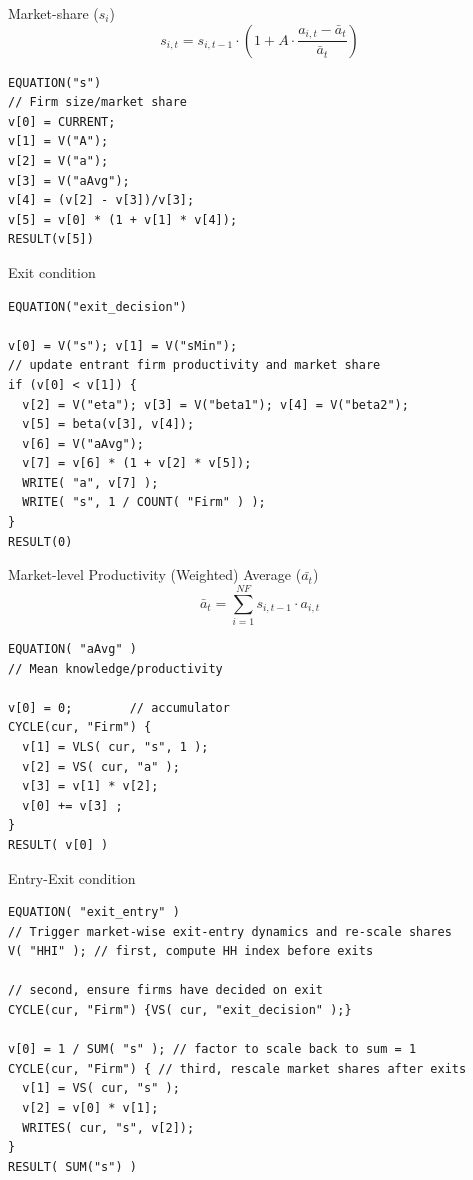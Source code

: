 \documentclass[bigger,aspectratio=169]{beamer}
\begin{document}
\begin{frame}[label={sec:orgd78fa78},fragile]{Market-share (\(s_{i}\))}
 \begin{equation}
s_{i,t} = s_{i,t-1} \cdot \left( 1 + A\cdot\frac{a_{i,t} - \bar{a}_{t}}{\bar{a}_{t}}\right)
\end{equation}


\begin{verbatim}
EQUATION("s")
// Firm size/market share
v[0] = CURRENT;
v[1] = V("A");
v[2] = V("a");
v[3] = V("aAvg");
v[4] = (v[2] - v[3])/v[3];
v[5] = v[0] * (1 + v[1] * v[4]);
RESULT(v[5])
\end{verbatim}
\end{frame}
\begin{frame}[label={sec:org3c3203a},fragile]{Exit condition}
 \begin{verbatim}
EQUATION("exit_decision")

v[0] = V("s"); v[1] = V("sMin");
// update entrant firm productivity and market share
if (v[0] < v[1]) {
  v[2] = V("eta"); v[3] = V("beta1"); v[4] = V("beta2");
  v[5] = beta(v[3], v[4]);
  v[6] = V("aAvg");
  v[7] = v[6] * (1 + v[2] * v[5]);
  WRITE( "a", v[7] );
  WRITE( "s", 1 / COUNT( "Firm" ) );
}
RESULT(0)
\end{verbatim}
\end{frame}
\begin{frame}[label={sec:org707f1d1},fragile]{Market-level Productivity (Weighted) Average (\(\bar{a_{t}}\))}
 \begin{equation}
\bar{a}_{t} =  \sum_{i=1}^{NF} s_{i, t-1}\cdot a_{i,t}
\end{equation}


\begin{verbatim}
EQUATION( "aAvg" )
// Mean knowledge/productivity

v[0] = 0;        // accumulator
CYCLE(cur, "Firm") {
  v[1] = VLS( cur, "s", 1 );
  v[2] = VS( cur, "a" );
  v[3] = v[1] * v[2];
  v[0] += v[3] ;
}
RESULT( v[0] )
\end{verbatim}
\end{frame}
\begin{frame}[label={sec:org9008db5},fragile]{Entry-Exit condition}
 \begin{verbatim}
EQUATION( "exit_entry" )
// Trigger market-wise exit-entry dynamics and re-scale shares
V( "HHI" ); // first, compute HH index before exits

// second, ensure firms have decided on exit
CYCLE(cur, "Firm") {VS( cur, "exit_decision" );}

v[0] = 1 / SUM( "s" ); // factor to scale back to sum = 1
CYCLE(cur, "Firm") { // third, rescale market shares after exits
  v[1] = VS( cur, "s" );
  v[2] = v[0] * v[1];
  WRITES( cur, "s", v[2]);
}
RESULT( SUM("s") )
\end{verbatim}
\end{frame}
\end{document}
